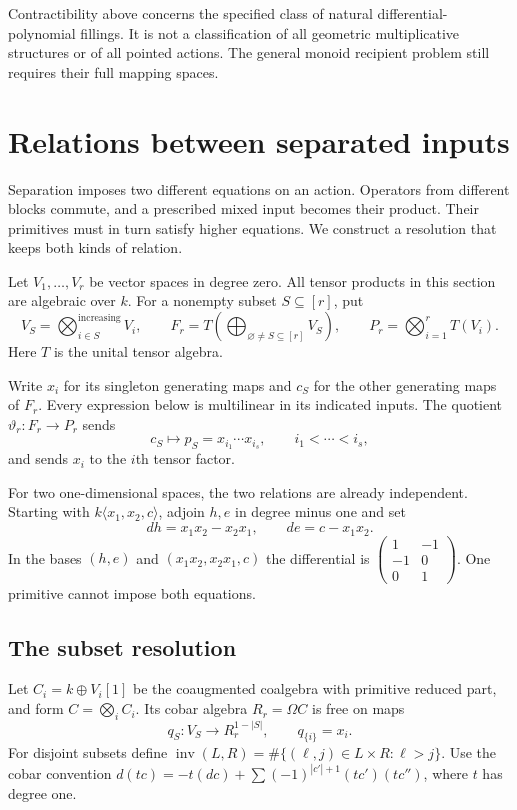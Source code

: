Contractibility above concerns the specified
class of natural differential-polynomial
fillings. It is not a classification of
all geometric multiplicative structures
or of all pointed actions. The general monoid
recipient problem still requires their
full mapping spaces.

\section{Relations between separated inputs}
\label{cbc:va:separated}

Separation imposes two different equations on an
action. Operators from different blocks commute,
and a prescribed mixed input becomes their product.
Their primitives must in turn satisfy higher
equations. We construct a resolution that keeps
both kinds of relation.

Let $V_1,\ldots,V_r$ be vector spaces in degree zero.
All tensor products in this section are algebraic
over $k$. For a nonempty subset $S\subseteq[r]$, put
\[
 V_S=\bigotimes_{i\in S}^{\mathrm{increasing}}V_i,
 \qquad
 F_r=T\left(\bigoplus_{\varnothing\ne S\subseteq[r]}V_S\right),
 \qquad P_r=\bigotimes_{i=1}^rT(V_i).
\]
Here $T$ is the unital tensor algebra.

Write $x_i$ for its singleton generating maps and
$c_S$ for the other generating maps of $F_r$.
Every expression below is multilinear in its
indicated inputs. The quotient
$\vartheta_r:F_r\to P_r$ sends
\[
 c_S\longmapsto p_S=x_{i_1}\cdots x_{i_s},
 \qquad i_1<\cdots<i_s,
\]
and sends $x_i$ to the $i$th tensor factor.

For two one-dimensional spaces, the two relations
are already independent. Starting with
$k\langle x_1,x_2,c\rangle$, adjoin $h,e$ in degree
minus one and set
\[
 dh=x_1x_2-x_2x_1,\qquad de=c-x_1x_2.
\]
In the bases $(h,e)$ and $(x_1x_2,x_2x_1,c)$
the differential is
$\left(\begin{smallmatrix}1&-1\\-1&0\\0&1\end{smallmatrix}\right)$.
One primitive cannot impose both equations.

\subsection{The subset resolution}

Let $C_i=k\oplus V_i[1]$ be the coaugmented coalgebra
with primitive reduced part, and form
$C=\bigotimes_iC_i$. Its cobar algebra $R_r=\Omega C$
is free on maps
\[
 q_S:V_S\longrightarrow R_r^{1-|S|},
 \qquad q_{\{i\}}=x_i.
\]
For disjoint subsets define
$\operatorname{inv}(L,R)=\#\{(\ell,j)\in L\times R:\ell>j\}$.
Use the cobar convention
$d(tc)=-t(dc)+\sum(-1)^{|c'|+1}(tc')(tc'')$,
where $t$ has degree one.

